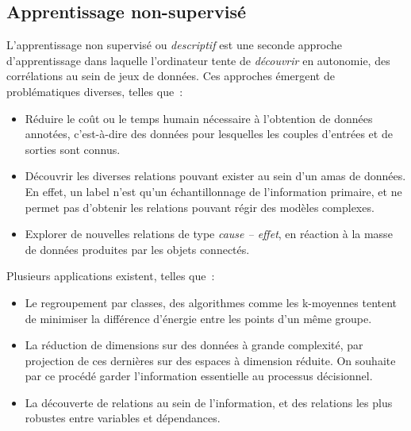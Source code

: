 \subsection{Apprentissage non-supervisé}
\label{sec:unsupervised_learning}
L’apprentissage non supervisé ou \textit{descriptif} est une seconde approche d’apprentissage dans laquelle l’ordinateur tente de \textit{découvrir} en autonomie, des corrélations au sein de jeux de données. Ces approches émergent de problématiques diverses, telles que~:
\begin{itemize}
    \item Réduire le coût ou le temps humain nécessaire à l’obtention de données annotées, c’est-à-dire des données pour lesquelles les couples d’entrées et de sorties sont connus.
    \item Découvrir les diverses relations pouvant exister au sein d’un amas de données. En effet, un label n’est qu’un échantillonnage de l’information primaire, et ne permet pas d’obtenir les relations pouvant régir des modèles complexes.
    \item Explorer de nouvelles relations de type \textit{cause – effet}, en réaction à la masse de données produites par les objets connectés.
\end{itemize}\par

Plusieurs applications existent, telles que~:
\begin{itemize}
	\item Le regroupement par classes, des algorithmes comme les k-moyennes tentent de minimiser la différence d’énergie entre les points d’un même groupe.
	\item La réduction de dimensions sur des données à grande complexité, par projection de ces dernières sur des espaces à dimension réduite. On souhaite par ce procédé garder l’information essentielle au processus décisionnel.
	\item La découverte de relations au sein de l’information, et des relations les plus robustes entre variables et dépendances.
\end{itemize}\par
 
